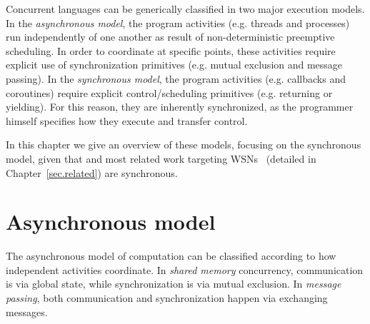 %

Concurrent languages can be generically classified in two major execution 
models.
%
In the \emph{asynchronous model}, the program activities (e.g. threads and 
processes) run independently of one another as result of non-deterministic 
preemptive scheduling.
In order to coordinate at specific points, these activities require explicit 
use of synchronization primitives (e.g. mutual exclusion and message passing).
%
In the \emph{synchronous model}, the program activities (e.g.  callbacks and 
coroutines) require explicit control/scheduling primitives (e.g. returning or 
yielding).
For this reason, they are inherently synchronized, as the programmer himself 
specifies how they execute and transfer control.

In this chapter we give an overview of these models, focusing on the 
synchronous model, given that \CEU and most related work targeting 
WSNs~\cite{wsn.nesc,wsn.protothreads,wsn.osm,wsn.tinythreads,wsn.sol,wsn.flowtalk,wsn.ocram} 
(detailed in Chapter~\ref{sec.related}) are synchronous.

\section{Asynchronous model}

The asynchronous model of computation can be classified according to how 
independent activities coordinate.
In \emph{shared memory} concurrency, communication is via global state, while 
synchronization is via mutual exclusion.
In \emph{message passing}, both communication and synchronization happen via 
exchanging messages.

